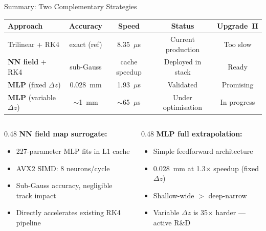 \documentclass[aspectratio=169, 11pt]{beamer}
\newcommand{\dz}{\Delta z}
\begin{document}
\begin{frame}{Summary: Two Complementary Strategies}

\begin{table}
\centering\small
\begin{tabular}{@{} l c c c c @{}}
  \toprule
  \textbf{Approach} & \textbf{Accuracy} & \textbf{Speed} &
    \textbf{Status} & \textbf{Upgrade~II} \\
  \midrule
  Trilinear + RK4 &
    exact (ref) & 8.35~$\mu$s & Current production &
    \textcolor{cachered}{Too slow} \\[4pt]
  \textcolor{nngreen}{\textbf{NN field}} + RK4 &
    sub-Gauss &  cache speedup &
    Deployed in stack &
    \textcolor{cachegreen}{Ready} \\[4pt]
  \textcolor{lhcbblue}{\textbf{MLP}} (fixed $\dz$) &
    0.028~mm & 1.93~$\mu$s &
    Validated &
    \textcolor{cachegreen}{Promising} \\[4pt]
  \textcolor{lhcbblue}{\textbf{MLP}} (variable $\dz$) &
    $\sim$1~mm & $\sim$65~$\mu$s &
    Under optimisation &
    \textcolor{rkorange}{In progress} \\
  \bottomrule
\end{tabular}
\end{table}

\vspace{6pt}
\begin{columns}[T]
\begin{column}{0.48\textwidth}
  \textbf{NN field map surrogate:}
  \begin{itemize}\small
    \item 227-parameter MLP fits in L1 cache
    \item AVX2 SIMD: 8 neurons/cycle
    \item Sub-Gauss accuracy, negligible track impact
    \item Directly accelerates existing RK4 pipeline
  \end{itemize}
\end{column}
\begin{column}{0.48\textwidth}
  \textbf{MLP full extrapolation:}
  \begin{itemize}\small
    \item Simple feedforward architecture
    \item 0.028~mm at 1.3$\times$ speedup (fixed $\dz$)
    \item Shallow-wide $>$ deep-narrow
    \item Variable $\dz$ is 35$\times$ harder --- active R\&D
  \end{itemize}
\end{column}
\end{columns}
\end{frame}
\end{document}

